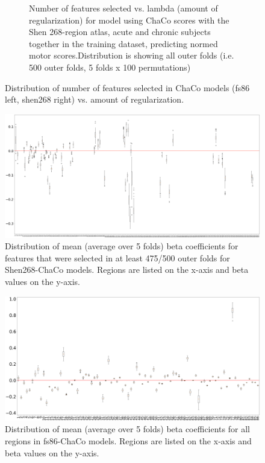 \documentclass[10pt]{article}
\begin{document}
\begin{figure}
\begin{subfigure}{0.5\textwidth}
  \caption{Number of features selected vs. lambda (amount of regularization) for model using ChaCo scores with the Shen 268-region atlas, acute and chronic subjects together in the training dataset, predicting normed motor scores.Distribution is showing all outer folds (i.e. 500 outer folds, 5 folds x 100 permutations)} 
  \label{fig:sfig2}
\end{subfigure}
\caption{Distribution of number of features selected in ChaCo models (fs86 left, shen268 right) vs. amount of regularization.}
\label{lambda_kappa}
\end{figure}


\begin{figure}[htp]
\centering
\includegraphics[width=1\linewidth]{figures/distribution_mean_beta_only_top95.png}
\caption{Distribution of mean (average over 5 folds) beta coefficients for features that were selected in at least 475/500 outer folds for Shen268-ChaCo models. Regions are listed on the x-axis and beta values on the y-axis.}
\label{shen_beta_coeffs}
\end{figure}


\begin{figure}[htp]
\centering
\includegraphics[width=1\linewidth]{figures/distribution_mean_beta_only_top95_fs.png}
\caption{ Distribution of mean (average over 5 folds) beta coefficients for all regions in fs86-ChaCo models. Regions are listed on the x-axis and beta values on the y-axis.}
\label{fs_beta_coeffs}
\end{figure}
\end{document}
